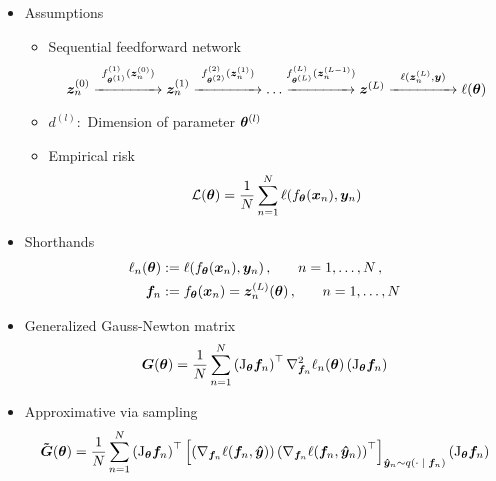 \begin{itemize}
\item Assumptions
  \begin{itemize}
  \item Sequential feedforward network
    \[
      \textstyle {\bm{z}}_n^{(0)}
      \stackrel{f^{(1)}_{{\bm{\theta}}^{(1)}}({\bm{z}}_n^{(0)})}{\xrightarrow{\hspace*{1.5cm}}}
      {\bm{z}}_n^{(1)}
      \stackrel{f^{(2)}_{{\bm{\theta}}^{(2)}}({\bm{z}}_n^{(1)})}{\xrightarrow{\hspace*{1.5cm}}}
      \ldots
      \stackrel{f^{(L)}_{{\bm{\theta}}^{(L)}}({\bm{z}}_n^{(L-1)})}{\xrightarrow{\hspace*{1.5cm}}}
      {\bm{z}}^{(L)} \stackrel{\ell({\bm{z}}_n^{(L)}, {\bm{y}})}{\xrightarrow{\hspace*{1.5cm}}}
      \ell({\bm{\theta}})
    \]
  \item $d^{(l)}:$ Dimension of parameter ${\bm{\theta}}^{(l)}$
  \item Empirical risk
    \begin{equation*}
      \mathcal{L}({\bm{\theta}}) = \frac{1}{N} \sum_{n=1}^N \ell(f_{{\bm{\theta}}}({\bm{x}}_n), {\bm{y}}_n)
    \end{equation*}
  \end{itemize}
\item Shorthands
  \begin{align*}
    \ell_n({\bm{\theta}})
    &:=
      \ell(f_{{\bm{\theta}}}({\bm{x}}_n), {\bm{y}}_n)\,{,}
      \qquad
      n = 1,\dots, N\,{,}
    \\
    {\bm{f}}_n
    &:=
      f_{{\bm{\theta}}}({\bm{x}}_n) = {\bm{z}}_n^{(L)}({\bm{\theta}})\,{,}
      \qquad n = 1,\dots, N
  \end{align*}
\item Generalized Gauss-Newton matrix
  \begin{align*}
    {\bm{G}}({\bm{\theta}})
    =
    \dfrac{1}{N}
    \sum_{n=1}^N
    \left(\mathrm{J}_{{\bm{\theta}}} {\bm{f}}_n\right)^\top
    \nabla_{{\bm{f}}_n}^2 \ell_n({\bm{\theta}})
    \left(\mathrm{J}_{{\bm{\theta}}} {\bm{f}}_n\right)
  \end{align*}
\item Approximative \GGN via \MC sampling
  \begin{align*}
    \bm{\tilde{{\bm{G}}}}({\bm{\theta}})
    =
    \dfrac{1}{N}
    \sum_{n=1}^N
    \left(\mathrm{J}_{{\bm{\theta}}} {\bm{f}}_n\right)^\top
    \left[
    \left(
    \nabla_{{\bm{f}}_n} \ell({\bm{f}}_n, {\bm{\hat{y}}})
    \right)
    \left(
    \nabla_{{\bm{f}}_n} \ell({\bm{f}}_n, {\bm{\hat{y}}}_n)
    \right)^\top
    \right]_{{\bm{\hat{y}}}_n \sim q(\cdot\;|\;{\bm{f}}_n)}
    \left(\mathrm{J}_{{\bm{\theta}}} {\bm{f}}_n\right)
  \end{align*}
\end{itemize}

